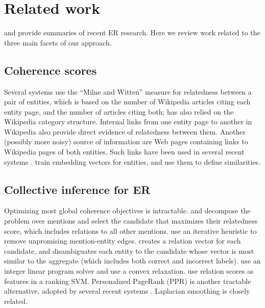 \section{Related work}
\label{sec:related}

 and  provide
summaries of recent ER research.  Here we review work related to the
three main facets of our approach.


\subsection{Coherence scores}

Several systems \cite{Milne2008,KulkarniSRC09,Hoffart2011} use the
``Milne and Witten'' measure for relatedness between a pair of
entities, which is based on the number of Wikipedia articles citing
each entity page, and the number of articles citing both;
 has also relied on the Wikipedia category
structure.  Internal links from one entity page to another in
Wikipedia also provide direct evidence of relatedness between them.
Another (possibly more noisy) source of information are Web pages
containing links \cite{singh12:wiki-links} to Wikipedia pages of both
entities.  Such links have been used in several recent systems
\cite{ChengR13,Chisholm2015}.   train embedding
vectors for entities, and use them to define similarities.


\subsection{Collective inference for ER}

Optimizing most global coherence objectives is
intractable.  and  decompose
the problem over mentions and select the candidate that maximizes
their relatedness score, which includes relations to all other
mentions.   use
an iterative heuristic to remove unpromising
mention-entity edges.   creates a relation vector
for each candidate, and disambiguates each entity to the candidate
whose vector is most similar to the aggregate (which includes both
correct and incorrect labels).   use an integer
linear program solver and  use a convex
relaxation.   use relation scores as features in a
ranking SVM.
Personalized PageRank (PPR) \cite{jeh2003scaling} is another tractable
alternative, adopted by several recent systems
\cite{Han2011,He13,Alhelbawy14,Pershina2015}.
Laplacian smoothing \cite{Huang2014} is closely related.

